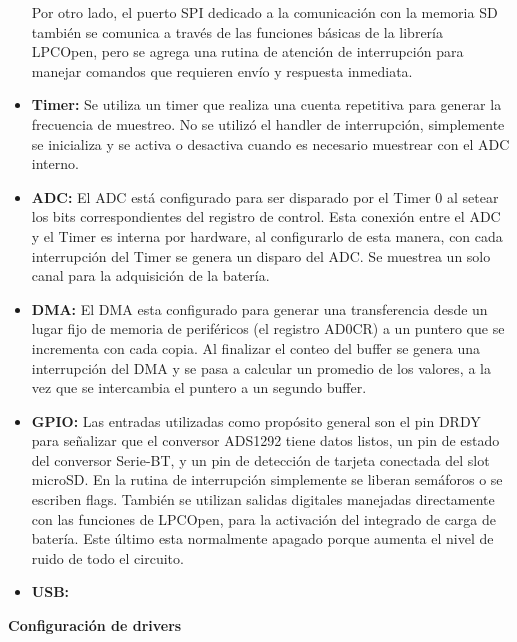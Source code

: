 \begin{itemize}
	Por otro lado, el puerto SPI dedicado a la comunicación con la memoria SD también se comunica a través de las funciones básicas de la librería LPCOpen, pero se agrega una rutina de atención de interrupción para manejar comandos que requieren envío y respuesta inmediata.

	\item \textbf{Timer:} Se utiliza un timer que realiza una cuenta repetitiva para generar la frecuencia de muestreo. No se utilizó el handler de interrupción, simplemente se inicializa y se activa o desactiva cuando es necesario muestrear con el ADC interno.

	\item \textbf{ADC:} El ADC está configurado para ser disparado por el Timer 0 al setear los bits correspondientes del registro de control. Esta conexión entre el ADC y el Timer es interna por hardware, al configurarlo de esta manera, con cada interrupción del Timer se genera un disparo del ADC. Se muestrea un solo canal para la adquisición de la batería.
	
	\item \textbf{DMA:} El DMA esta configurado para generar una transferencia desde un lugar fijo de memoria de periféricos (el registro AD0CR) a un puntero que se incrementa con cada copia. Al finalizar el conteo del buffer se genera una interrupción del DMA y se pasa a calcular un promedio de los valores, a la vez que se intercambia el puntero a un segundo buffer.
	
 	\item \textbf{GPIO:} Las entradas utilizadas como propósito general son el pin DRDY para señalizar que el conversor ADS1292 tiene datos listos, un pin de estado del conversor Serie-BT, y un pin de detección de tarjeta conectada del slot microSD. En la rutina de interrupción simplemente se liberan semáforos o se escriben flags. También se utilizan salidas digitales manejadas directamente con las funciones de LPCOpen, para la activación del integrado de carga de batería. Este último esta normalmente apagado porque aumenta el nivel de ruido de todo el circuito.

	\item \textbf{USB:} 


\end{itemize}

\textbf{Configuración de drivers}

